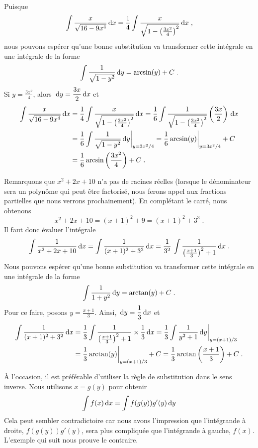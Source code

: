 {\begin{egg}
 Puisque
\[
\int \frac{x}{\sqrt{16 - 9x^4}} \,\mathrm{d}x = 
\frac{1}{4} \int \frac{x}{\sqrt{1 - \left(\frac{3x^2}{4}\right)^2}}
\,\mathrm{d}x \; ,
\]
nous pouvons espérer qu'une bonne substitution va transformer cette
intégrale en une intégrale de la forme
\[
\int \frac{1}{\sqrt{1-y^2}} \,\mathrm{d}y = \arcsin(y)+C \; .
\]
Si $\displaystyle y = \frac{3x^2}{4}$, alors
$\displaystyle \,\mathrm{d}y = \frac{3x}{2} \,\mathrm{d}x$ et
\begin{align*}
\int \frac{x}{\sqrt{16 - 9x^4}} \,\mathrm{d}x &= 
\frac{1}{4} \int \frac{x}{\sqrt{1 - \left(\frac{3x^2}{4}\right)^2}} \,\mathrm{d}x
= \frac{1}{6} \int \frac{1}{\sqrt{1 - \left(\frac{3x^2}{4}\right)^2}}
\left( \frac{3x}{2}\right) \,\mathrm{d}x \\
&= \frac{1}{6} \int \frac{1}{\sqrt{1-y^2}} \,\mathrm{d}y \bigg|_{y=3x^2/4}
= \frac{1}{6} \arcsin(y)\bigg|_{y=3x^2/4} + C \\
&= \frac{1}{6} \arcsin\left(\frac{3x^2}{4} \right) + C \; .
\end{align*}

 Remarquons que $x^2+2x+10$ n'a pas de racines réelles
(lorsque le dénominateur sera un polynôme qui peut être factorisé, nous
ferons appel aux fractions partielles que nous verrons prochainement).  En
complétant le carré, nous obtenons
\[
x^2+2x+10 = (x+1)^2 + 9 = (x+1)^2 +3^3 \; .
\]
Il faut donc évaluer l'intégrale
\[
\int \frac{1}{x^2+2x+10} \,\mathrm{d}x = \int \frac{1}{(x+1)^2+3^2} \,\mathrm{d}x
= \frac{1}{3^2} \, \int \frac{1}{\left(\frac{x+1}{3}\right)^2+1} \,\mathrm{d}x \; .
\]
Nous pouvons espérer qu'une bonne substitution va transformer cette
intégrale en une intégrale de la forme
\[
\int \frac{1}{1+y^2} \,\mathrm{d}y = \arctan(y)+C \; .
\]
Pour ce faire, posons $\displaystyle y = \frac{x+1}{3}$.  Ainsi,
$\displaystyle \,\mathrm{d}y = \frac{1}{3} \,\mathrm{d}x$ et
\begin{align*}
\int \frac{1}{(x+1)^2+3^2} \,\mathrm{d}x &= \frac{1}{3}
\int \frac{1}{\left(\frac{x+1}{3}\right)^2 + 1} \times \frac{1}{3} \,\mathrm{d}x
= \frac{1}{3} \int \frac{1}{y^2+1} \,\mathrm{d}y \bigg|_{y=(x+1)/3} \\
&= \frac{1}{3} \arctan(y) \bigg|_{y=(x+1)/3} + C
= \frac{1}{3} \arctan\left(\frac{x+1}{3}\right) + C \; .
\end{align*}
\label{EGintegration}
\end{egg}

À l'occasion, il est préférable d'utiliser la règle de substitution
dans le sens inverse.  Nous utilisons $x = g(y)$ pour obtenir
\[
\int f(x) \,\mathrm{d}x  = \int f(g(y))g'(y) \,\mathrm{d}y
\]
Cela peut sembler contradictoire car nous avons l'impression que
l'intégrande à droite, $f(g(y))g'(y)$, sera plus compliquée que
l'intégrande à gauche, $f(x)$.  L'exemple qui suit nous prouve le
contraire.

}
